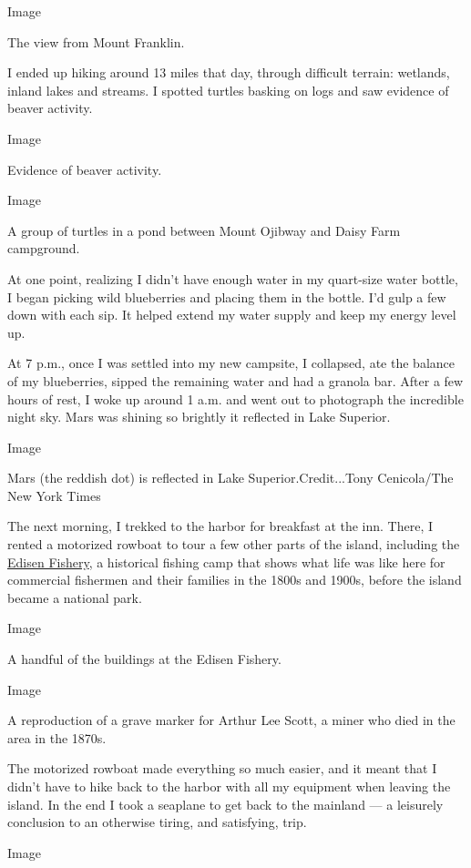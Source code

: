 Image

The view from Mount Franklin.

I ended up hiking around 13 miles that day, through difficult terrain:
wetlands, inland lakes and streams. I spotted turtles basking on logs
and saw evidence of beaver activity.

Image

Evidence of beaver activity.

Image

A group of turtles in a pond between Mount Ojibway and Daisy Farm
campground.

At one point, realizing I didn't have enough water in my quart-size
water bottle, I began picking wild blueberries and placing them in the
bottle. I'd gulp a few down with each sip. It helped extend my water
supply and keep my energy level up.

At 7 p.m., once I was settled into my new campsite, I collapsed, ate the
balance of my blueberries, sipped the remaining water and had a granola
bar. After a few hours of rest, I woke up around 1 a.m. and went out to
photograph the incredible night sky. Mars was shining so brightly it
reflected in Lake Superior.

Image

Mars (the reddish dot) is reflected in Lake Superior.Credit...Tony
Cenicola/The New York Times

The next morning, I trekked to the harbor for breakfast at the inn.
There, I rented a motorized rowboat to tour a few other parts of the
island, including the
\href{http://iri.forest.mtu.edu/Historic_Fisheries/Pages/Rock_Tobin_Harbor/Edisen.htm}{Edisen
Fishery}, a historical fishing camp that shows what life was like here
for commercial fishermen and their families in the 1800s and 1900s,
before the island became a national park.

Image

A handful of the buildings at the Edisen Fishery.

Image

A reproduction of a grave marker for Arthur Lee Scott, a miner who died
in the area in the 1870s.

The motorized rowboat made everything so much easier, and it meant that
I didn't have to hike back to the harbor with all my equipment when
leaving the island. In the end I took a seaplane to get back to the
mainland --- a leisurely conclusion to an otherwise tiring, and
satisfying, trip.

Image

